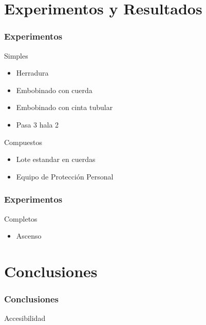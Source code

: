 \documentclass{beamer}
\begin{document}
\section{Experimentos y Resultados}
\begin{frame}
  \frametitle{Experimentos}
  
  \begin{block}{Simples}
		\begin{itemize}
		\item Herradura
		\item Embobinado con cuerda
		\item Embobinado con cinta tubular
		\item Pasa 3 hala 2
 		\end{itemize}
	   \end{block}
\begin{block}{Compuestos}
	\begin{itemize}
		\item Lote estandar en cuerdas
		\item Equipo de Protecci\'{o}n Personal
	\end{itemize}
\end{block}
\end{frame}

\begin{frame}
\frametitle{Experimentos}
\begin{block}{Completos}
	\begin{itemize}
		\item Ascenso
		
	\end{itemize}
\end{block}
\end{frame}

\section{Conclusiones}
\begin{frame}
\frametitle{Conclusiones}
\begin{block}{Accesibilidad}

\end{block}


\end{frame}
\end{document}
